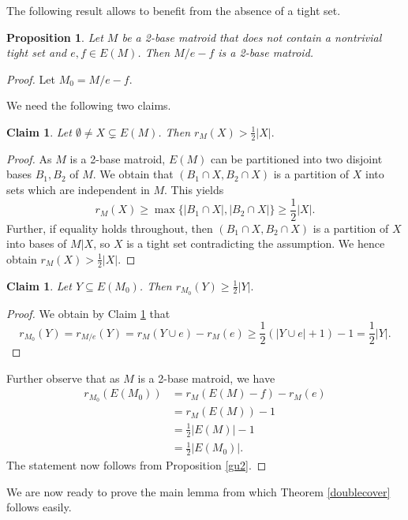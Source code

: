 \documentclass{article}
\newtheorem{Proposition}[Statement]{Proposition}
\newtheorem{Claim}[Statement]{Claim}
\begin{document}
The following result allows to benefit from the absence of a tight set. %
\begin{Proposition}\label{delcon}
Let $M$ be a 2-base matroid that does not contain a nontrivial tight set and $e,f \in E(M)$. Then $M/e-f$ is a 2-base matroid. 
\end{Proposition}
\begin{proof}
Let $M_0=M/e-f$. 

We need the following two claims.
\begin{Claim}\label{un}
Let $\emptyset \neq X \subsetneq E(M)$. Then $r_{M}(X)> \frac{1}{2}|X|.$
\end{Claim}
\begin{proof}
As $M$ is a 2-base matroid, $E(M)$ can be partitioned into two disjoint bases $B_1,B_2$ of $M$. We obtain that $(B_1\cap X, B_2 \cap X)$ is a partition of $X$ into sets which are independent in $M$. This yields $$r_M(X)\geq \max\{|B_1 \cap X|,|B_2 \cap X|\}\geq \frac{1}{2}|X|.$$ Further, if equality holds throughout, then $(B_1\cap X, B_2 \cap X)$ is a partition of $X$ into bases of $M|X$, so $X$ is a tight set contradicting the assumption. We hence obtain $r_M(X)>\frac{1}{2}|X|$.
\end{proof}

\begin{Claim}\label{deux}
Let $Y \subseteq E(M_0)$. Then $r_{M_0}(Y)\geq \frac{1}{2}|Y|.$
\end{Claim}
\begin{proof}

We obtain by Claim \ref{un} that $$r_{M_0}(Y)=r_{M/e}(Y)=r_M(Y \cup e)-r_M(e)\geq \frac{1}{2}(|Y \cup e|+1)-1= \frac{1}{2}|Y|.$$
\end{proof}

Further observe that as $M$ is a 2-base matroid, we have \begin{align*}r_{M_0}(E(M_0))&=r_M(E(M)-f)-r_M(e)\\&=r_M(E(M))-1\\&=\frac{1}{2}|E(M)|-1\\&=\frac{1}{2}|E(M_0)|.\end{align*}
The statement now follows from Proposition \ref{gu2}.%
\end{proof}

We are now ready to prove the main lemma from which Theorem \ref{doublecover} follows easily.
\end{document}
